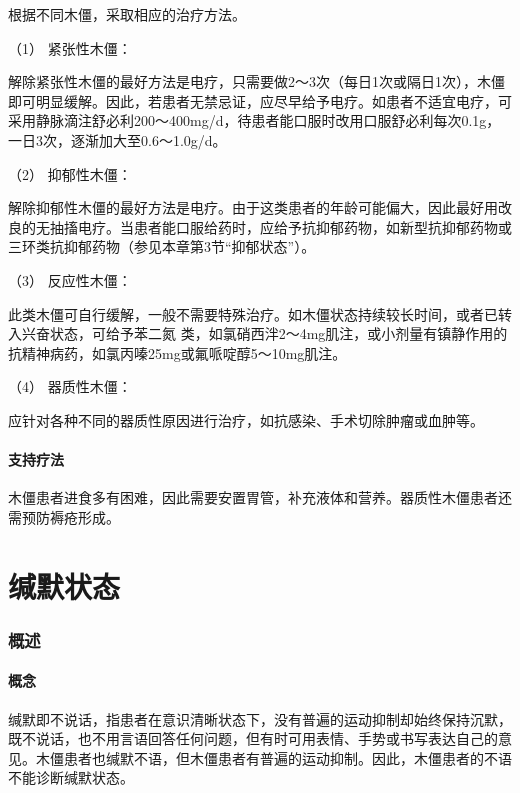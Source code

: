 根据不同木僵，采取相应的治疗方法。

\hypertarget{text00046.htmlux5cux23CHP1-18-4-3-2-1}{}
（1） 紧张性木僵：

解除紧张性木僵的最好方法是电疗，只需要做2～3次（每日1次或隔日1次），木僵即可明显缓解。因此，若患者无禁忌证，应尽早给予电疗。如患者不适宜电疗，可采用静脉滴注舒必利200～400mg/d，待患者能口服时改用口服舒必利每次0.1g，一日3次，逐渐加大至0.6～1.0g/d。

\hypertarget{text00046.htmlux5cux23CHP1-18-4-3-2-2}{}
（2） 抑郁性木僵：

解除抑郁性木僵的最好方法是电疗。由于这类患者的年龄可能偏大，因此最好用改良的无抽搐电疗。当患者能口服给药时，应给予抗抑郁药物，如新型抗抑郁药物或三环类抗抑郁药物（参见本章第3节“抑郁状态”）。

\hypertarget{text00046.htmlux5cux23CHP1-18-4-3-2-3}{}
（3） 反应性木僵：

此类木僵可自行缓解，一般不需要特殊治疗。如木僵状态持续较长时间，或者已转入兴奋状态，可给予苯二氮{}
类，如氯硝西泮2～4mg肌注，或小剂量有镇静作用的抗精神病药，如氯丙嗪25mg或氟哌啶醇5～10mg肌注。

\hypertarget{text00046.htmlux5cux23CHP1-18-4-3-2-4}{}
（4） 器质性木僵：

应针对各种不同的器质性原因进行治疗，如抗感染、手术切除肿瘤或血肿等。

\paragraph{支持疗法}

木僵患者进食多有困难，因此需要安置胃管，补充液体和营养。器质性木僵患者还需预防褥疮形成。

\protect\hypertarget{text00047.html}{}{}

\section{缄默状态}

\subsubsection{概述}

\paragraph{概念}

缄默即不说话，指患者在意识清晰状态下，没有普遍的运动抑制却始终保持沉默，既不说话，也不用言语回答任何问题，但有时可用表情、手势或书写表达自己的意见。木僵患者也缄默不语，但木僵患者有普遍的运动抑制。因此，木僵患者的不语不能诊断缄默状态。

